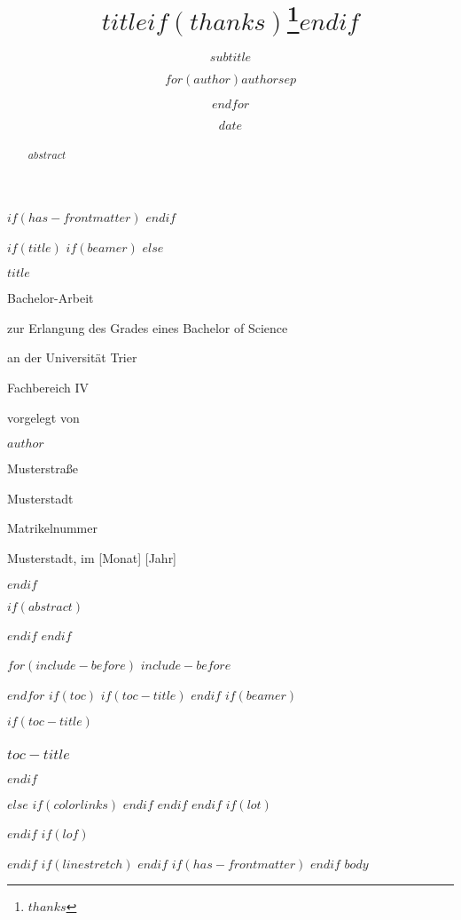 \documentclass[
  $if(fontsize)$
  $fontsize$,
  $endif$
  $if(lang)$
  $babel-lang$,
  $endif$
  $if(papersize)$
  $papersize$paper,
  $endif$
  $if(beamer)$
  ignorenonframetext,
  $if(handout)$
  handout,
  $endif$
  $if(aspectratio)$
  aspectratio=$aspectratio$,
  $endif$
  $endif$
  $for(classoption)$
  $classoption$$sep$,
  $endfor$
]{$documentclass$}
\title{$title$$if(thanks)$\thanks{$thanks$}$endif$}
\subtitle{$subtitle$}
\author{$for(author)$$author$$sep$ \and $endfor$}
\date{$date$}
\institute{$for(institute)$$institute$$sep$ \and $endfor$}
\begin{document}
$if(has-frontmatter)$
\frontmatter
$endif$

$if(title)$
$if(beamer)$
\frame{\titlepage}
$else$
\begin{titlepage}
  \begin{center}
    \vspace*{1cm}

    \Huge
    \textbf{$title$}

    \vspace{2cm}
    \LARGE

    Bachelor-Arbeit

    zur Erlangung des Grades eines Bachelor of Science

    \vspace{1cm}

    an der Universität Trier 
    
    Fachbereich IV

    \vspace{3cm}
    vorgelegt von

    \textbf{$author$}

    Musterstraße

    Musterstadt

    Matrikelnummer
    \vfill

    Musterstadt, im [Monat] [Jahr]

  \end{center}
\end{titlepage}
$endif$


\clearpage


$if(abstract)$
\begin{abstract}
  $abstract$
\end{abstract}
$endif$
$endif$

$for(include-before)$
$include-before$

$endfor$
$if(toc)$
$if(toc-title)$
\renewcommand*\contentsname{$toc-title$}
$endif$
$if(beamer)$
\begin{frame}[allowframebreaks]
  $if(toc-title)$
  \frametitle{$toc-title$}
  $endif$
  \tableofcontents[hideallsubsections]
\end{frame}
$else$
{
    $if(colorlinks)$
    \hypersetup{linkcolor=$if(toccolor)$$toccolor$$else$$endif$}
    $endif$
    \setcounter{tocdepth}{$toc-depth$}
    \tableofcontents
  }
$endif$
$endif$
$if(lot)$
\listoftables
$endif$
$if(lof)$
\listoffigures
$endif$
$if(linestretch)$
$endif$
$if(has-frontmatter)$
\mainmatter
$endif$
$body$
\end{document}
